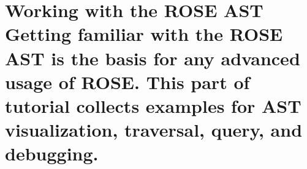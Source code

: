 \documentclass[10pt]{book}
\begin{document}

% 

\mainmatter


%


\part[Working with the ROSE AST]{  Working with the ROSE AST \\
\vspace{1.0in}
\normalsize{Getting familiar with the ROSE AST is the basis for any advanced
usage of ROSE. This part of tutorial collects examples for AST
visualization, traversal, query, and debugging.}
}
\end{document}
